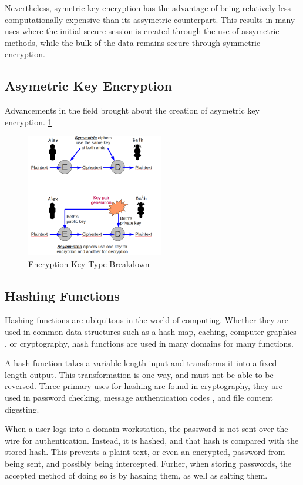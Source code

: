 \documentclass[journal]{IEEEtran}
\begin{document}
Nevertheless, symetric key encryption has the advantage of being relatively less computationally expensive than its assymetric counterpart.  This results in many uses where the initial secure session is created through the use of assymetric methods, while the bulk of the data remains secure through symmetric encryption.


\subsection{Asymetric Key Encryption}

Advancements in the field brought about the creation of asymetric key encryption.  \ref{keytypes}



\begin{figure}[htbp]
	\centering
	\includegraphics[width=6cm,keepaspectratio]{img/encryptionkeytypes.png}
	\caption{Encryption Key Type Breakdown \cite{KeyFigure} }
	\label{keytypes}
\end{figure}


\subsection{Hashing Functions}

Hashing functions are ubiquitous in the world of computing.  Whether they are used in common data structures such as a hash map, caching, computer graphics \cite{gpu}, or cryptography, hash functions are used in many domains for many functions.  

A hash function takes a variable length input and transforms it into a fixed length output.  This transformation is one way, and must not be able to be reversed.  Three primary uses for hashing are found in cryptography, they are used in password checking, message authentication codes \cite{hash}, and file content digesting.

When a user logs into a domain workstation, the password is not sent over the wire for authentication.  Instead, it is hashed, and that hash is compared with the stored hash.  This prevents a plaint text, or even an encrypted, password from being sent, and possibly being intercepted.  Furher, when storing passwords, the accepted method of doing so is by hashing them, as well as salting them. 
\end{document}
